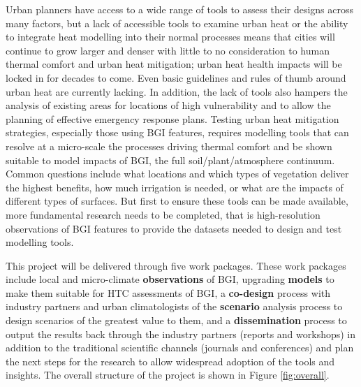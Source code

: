 Urban planners have access to a wide range of tools to assess their designs across many factors, but a lack of accessible tools to examine urban heat or the ability to integrate heat modelling into their normal processes means that cities will continue to grow larger and denser with little to no consideration to human thermal comfort and urban heat mitigation; urban heat health impacts will be locked in for decades to come. Even basic guidelines and rules of thumb around urban heat are currently lacking. In addition, the lack of tools also hampers the analysis of existing areas for locations of high vulnerability and to allow the planning of effective emergency response plans. Testing urban heat mitigation strategies, especially those using BGI features, requires modelling tools that can resolve at a micro-scale the processes driving thermal comfort and be shown suitable to model impacts of BGI, the full soil/plant/atmosphere continuum. Common questions include what locations and which types of vegetation deliver the highest benefits, how much irrigation is needed, or what are the impacts of different types of surfaces. But first to ensure these tools can be made available, more fundamental research needs to be completed, that is high-resolution observations of BGI features to provide the datasets needed to design and test modelling tools. 

This project will be delivered through five work packages. These work packages include local and micro-climate \textbf{observations} of BGI, upgrading \textbf{models} to make them suitable for HTC assessments of BGI, a \textbf{co-design} process with industry partners and urban climatologists of the \textbf{scenario} analysis process to design scenarios of the greatest value to them, and a \textbf{dissemination} process to output the results back through the industry partners (reports and workshops) in addition to the traditional scientific channels (journals and conferences) and plan the next steps for the research to allow widespread adoption of the tools and insights. The overall structure of the project is shown in Figure \ref{fig:overall}.

